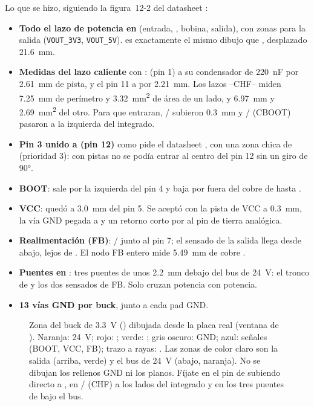Lo que se hizo, siguiendo la figura~12-2 del datasheet :
\begin{itemize}
  \item \textbf{Todo el lazo de potencia en } (entrada, , bobina, salida), con zonas para la salida
  (\texttt{VOUT\_3V3}, \texttt{VOUT\_5V}).  es exactamente el mismo dibujo que , desplazado
  \SI{21.6}{\milli\meter}.
  \item \textbf{Medidas del lazo caliente} con  \medido:  (pin 1) a su condensador
  de \SI{220}{\nano\farad}  por \SI{2.61}{\milli\meter} de pista, y el pin 11 a  por
  \SI{2.21}{\milli\meter}. Los lazos --CHF-- miden \SI{7.25}{\milli\meter} de perímetro y
  \SI{3.32}{\milli\meter\squared} de área de un lado, y \SI{6.97}{\milli\meter} y \SI{2.69}{\milli\meter\squared} del
  otro. Para que entraran, / subieron \SI{0.3}{\milli\meter} y / (CBOOT) pasaron a
  la izquierda del integrado.
  \item \textbf{Pin 3 unido a  (pin 12)} como pide el datasheet , con una zona
  chica de  (prioridad 3): con pistas no se podía entrar al centro del pin 12 sin un giro de \ang{90}.
  \item \textbf{BOOT}: sale por la izquierda del pin 4 y baja por fuera del cobre de  hasta .
  \item \textbf{VCC}:  quedó a \SI{3.0}{\milli\meter} del pin 5. Se aceptó con la pista de VCC a
  \SI{0.3}{\milli\meter}, la vía GND pegada a  y un retorno corto por  al pin de tierra analógica.
  \item \textbf{Realimentación (FB)}: / junto al pin 7; el sensado de la salida llega desde abajo,
  lejos de . El nodo FB entero mide \SI{5.49}{\milli\meter} de cobre \medido.
  \item \textbf{Puentes en }: tres puentes de unos \SI{2.2}{\milli\meter} debajo del bus de
  \SI{24}{\volt}: el tronco de  y los dos sensados de FB. Solo cruzan potencia con potencia.
  \item \textbf{13 vías GND por buck}, junto a cada pad GND.
\end{itemize}

\begin{figure}[htbp]
\centering

\caption{Zona del buck de \SI{3.3}{\volt} () dibujada desde la placa real (ventana de
). Naranja: \SI{24}{\volt}; rojo: ; verde: ; gris oscuro: GND;
azul: señales (BOOT, VCC, FB); trazo a rayas: . Las zonas de color claro son la salida (arriba, verde) y el
bus de \SI{24}{\volt} (abajo, naranja). No se dibujan los rellenos GND ni los planos. Fíjate en el pin  de
 subiendo directo a , en / (CHF) a los lados del integrado y en los tres puentes de
 bajo el bus.}
\label{fig:c09-buck}
\end{figure}

